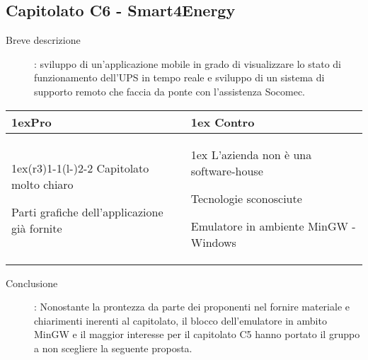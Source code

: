 \subsection{Capitolato C6 - Smart4Energy}
\begin{description}
\item [Breve descrizione]: sviluppo di un’applicazione mobile in grado di visualizzare lo stato di funzionamento dell'UPS in tempo reale e sviluppo di un sistema di supporto remoto che faccia da ponte con l'assistenza Socomec.
\end{description}
\begin{table}[h]
\begin{tabularx}{\linewidth}{>{\parskip1ex}X@{\kern4\tabcolsep}>{\parskip1ex}X}
\hfil\bfseries Pro
&
\hfil\bfseries Contro
\\\cmidrule(r{3\tabcolsep}){1-1}\cmidrule(l{-\tabcolsep}){2-2}
Capitolato molto chiaro \par
Parti grafiche dell'applicazione già fornite
&
L'azienda non è una software-house \par
Tecnologie sconosciute \par
Emulatore in ambiente MinGW - Windows \\
\end{tabularx}
\end{table}
\begin{description}
	\item [Conclusione]: Nonostante la prontezza da parte dei proponenti nel fornire materiale e chiarimenti inerenti al capitolato, il blocco dell'emulatore in ambito MinGW e il maggior interesse per il capitolato C5 hanno portato il gruppo a non scegliere la seguente proposta.
\end{description}
